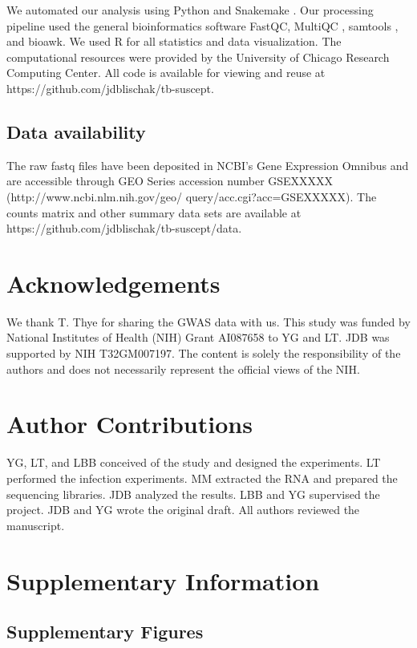 \documentclass[fleqn,10pt]{wlscirep}
\newcommand{\beginsupplement}{%
 \setcounter{table}{0}
 \renewcommand{\thetable}{S\arabic{table}}%
 \setcounter{figure}{0}
 \renewcommand{\thefigure}{S\arabic{figure}}%
 }
\begin{document}
We automated our analysis using Python and Snakemake
\cite{Koster2012}. Our processing pipeline used the general
bioinformatics software FastQC, MultiQC \cite{Ewels2016}, samtools
\cite{Li2009}, and bioawk. We used R for all statistics and data
visualization. The computational resources were provided by the
University of Chicago Research Computing Center. All code is available
for viewing and reuse at https://github.com/jdblischak/tb-suscept.
\subsection*{Data availability}

The raw fastq files have been deposited in NCBI's Gene Expression
Omnibus \cite{Edgar2002} and are accessible through GEO Series
accession number GSEXXXXX (http://www.ncbi.nlm.nih.gov/geo/
query/acc.cgi?acc=GSEXXXXX). The counts matrix and other summary data
sets are available at https://github.com/jdblischak/tb-suscept/data.
\section*{Acknowledgements}

We thank T. Thye for sharing the GWAS data with us. This study was
funded by National Institutes of Health (NIH) Grant AI087658 to YG and
LT. JDB was supported by NIH T32GM007197. The content is solely the
responsibility of the authors and does not necessarily represent the
official views of the NIH.
\section*{Author Contributions}

YG, LT, and LBB conceived of the study and designed the experiments.
LT performed the infection experiments. MM extracted the RNA and
prepared the sequencing libraries. JDB analyzed the results. LBB and
YG supervised the project. JDB and YG wrote the original draft. All
authors reviewed the manuscript.



\clearpage\newpage
\beginsupplement
\section*{Supplementary Information}

\subsection*{Supplementary Figures}
\end{document}
